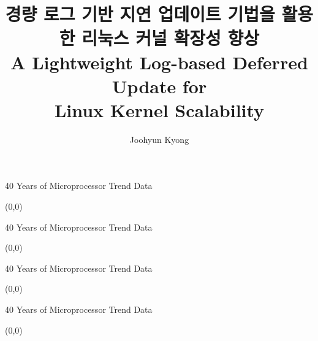 \documentclass[english]{beamer} %
\begin{document}
\title[Memory Scalability]{
경량 로그 기반 지연 업데이트 기법을 활용한 리눅스 커널 확장성 향상 \\
\small{A Lightweight Log-based Deferred Update
for \\Linux Kernel Scalability}}

\author{Joohyun Kyong}


\begin{frame}
  \titlepage
\end{frame}

\begin{frame}{40 Years of Microprocessor Trend Data}
\begin{textblock}{1}(0,0)
\end{textblock}
\end{frame}


\begin{frame}{40 Years of Microprocessor Trend Data}
\begin{textblock}{1}(0,0)
\end{textblock}
\end{frame}


\begin{frame}{40 Years of Microprocessor Trend Data}
\begin{textblock}{1}(0,0)
\end{textblock}
\end{frame}


\begin{frame}{40 Years of Microprocessor Trend Data}
\begin{textblock}{1}(0,0)
\end{textblock}
\end{frame}
\end{document}
